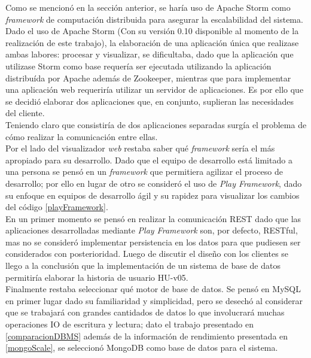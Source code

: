 Como se mencionó en la sección anterior, se haría uso de Apache Storm como \textit{framework} de computación distribuida para asegurar la escalabilidad del sistema. Dado el uso de Apache Storm (Con su versión 0.10 disponible al momento de la realización de este trabajo), la elaboración de una aplicación única que realizase ambas labores: procesar y visualizar, se dificultaba, dado que la aplicación que utilizase Storm como base requería ser ejecutada utilizando la aplicación distribuída por Apache además de Zookeeper, mientras que para implementar una aplicación web requeriría utilizar un servidor de aplicaciones. Es por ello que se decidió elaborar dos aplicaciones que, en conjunto, suplieran las necesidades del cliente.\\

Teniendo claro que consistiría de dos aplicaciones separadas surgía el problema de cómo realizar la comunicación entre ellas.\\

Por el lado del visualizador \textit{web} restaba saber qué \textit{framework} sería el más apropiado para su desarrollo. Dado que el equipo de desarrollo está limitado a una persona se pensó en un \textit{framework} que permitiera agilizar el proceso de desarrollo; por ello en lugar de otro se consideró el uso de \textit{Play Framework}, dado su enfoque en equipos de desarrollo ágil y su rapidez para visualizar los cambios del código \ref{playFramework}.\\

En un primer momento se pensó en realizar la comunicación REST dado que las aplicaciones desarrolladas mediante \textit{Play Framework} son, por defecto, RESTful, mas no se consideró implementar persistencia en los datos para que pudiesen ser considerados con posterioridad. Luego de discutir el diseño con los clientes se llego a la conclusión que la implementación de un sistema de base de datos permitiría elaborar la historia de usuario HU-v05.\\

Finalmente restaba seleccionar qué motor de base de datos. Se pensó en MySQL en primer lugar dado su familiaridad y simplicidad, pero se desechó al considerar que se trabajará con grandes cantidados de datos lo que involucrará muchas operaciones IO de escritura y lectura; dato el trabajo presentado en \ref{comparacionDBMS} además de la información de rendimiento presentada en \ref{mongoScale}, se seleccionó MongoDB como base de datos para el sistema.\\

